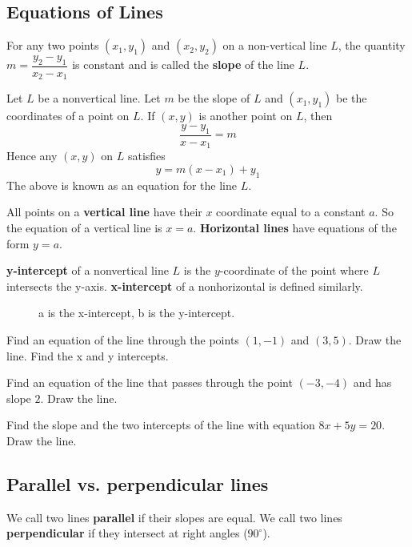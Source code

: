 \documentclass[../main.tex]{subfiles}
\begin{document}
  \subsection*{Equations of Lines}
  For any two points $(x_1, y_1)$ and $(x_2, y_2)$ on a non-vertical line $L$, the quantity $m=\dfrac{y_2-y_1}{x_2-x_1}$ is constant and is called the \textbf{slope} of the line $L$.

  Let $L$ be a nonvertical line. Let $m$ be the slope of $L$ and $(x_1, y_1)$ be the coordinates of a point on $L$. If $(x,y)$ is another point on $L$, then
  \[
    \frac{y-y_1}{x-x_1} = m
  \]
  Hence any $(x,y)$ on $L$ satisfies
  \[
    y = m(x-x_1) + y_1
  \]
  The above is known as an equation for the line $L$.

  All points on a \textbf{vertical line} have their $x$ coordinate equal to a constant $a$. So the equation of a vertical line is $x=a$. \textbf{Horizontal lines} have equations of the form $y=a$.

  \textbf{y-intercept} of a nonvertical line $L$ is the $y$-coordinate of the point where $L$ intersects the y-axis. \textbf{x-intercept} of a nonhorizontal is defined similarly.

  \begin{figure}[H]
    \centering
    
    \caption{a is the x-intercept, b is the y-intercept.}
  \end{figure}
  \begin{example}
    Find an equation of the line through the points $(1,-1)$ and $(3,5)$. Draw the line. Find the x and y intercepts.
  \end{example}

  \begin{example}
    Find an equation of the line that passes through the point $(-3,-4) $ and has slope $2$. Draw the line.
  \end{example}

  \begin{example}
    Find the slope and the two intercepts of the line with equation $8x+5y=20$. Draw the line.
  \end{example}

  \subsection*{Parallel vs. perpendicular lines}
  We call two lines \textbf{parallel} if their slopes are equal. We call two lines \textbf{perpendicular} if they intersect at right angles ($90^{\circ}$).
\end{document}

